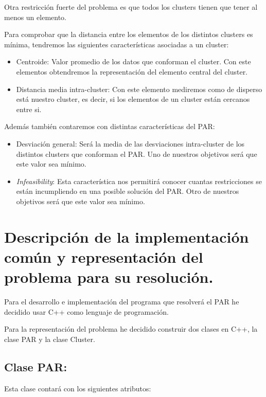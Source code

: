 \documentclass[12pt, spanish]{article}
\begin{document}
Otra restricción fuerte del problema es que todos los clusters tienen que tener al menos un elemento.

Para comprobar que la distancia entre los elementos de los distintos clusters es mínima, tendremos las siguientes características asociadas a un cluster:

\begin{itemize}
	\item{Centroide: Valor promedio de los datos que conforman el cluster. Con este elementos obtendremos la representación del elemento central del cluster.}
	\item{Distancia media intra-cluster: Con este elemento mediremos como de disperso está nuestro cluster, es decir, si los elementos de un cluster están cercanos entre si.}
\end{itemize}

Además también contaremos con distintas características del PAR:

\begin{itemize}
	\item{Desviación general: Será la media de las desviaciones intra-cluster de los distintos clusters que conforman el PAR. Uno de nuestros objetivos será que este valor sea mínimo.}
	\item{\textit{Infeasibility}: Esta característica nos permitirá conocer cuantas restricciones se están incumpliendo en una posible solución del PAR. Otro de nuestros objetivos será que este valor sea mínimo.}
\end{itemize}

\newpage

\section{Descripción de la implementación común y representación del problema para su resolución.}

Para el desarrollo e implementación del programa que resolverá el PAR he decidido usar C++ como lenguaje de programación.

Para la representación del problema he decidido construir dos clases en C++, la clase PAR y la clase Cluster.



\subsection{Clase PAR:}


Esta clase contará con los siguientes atributos:
\end{document}
